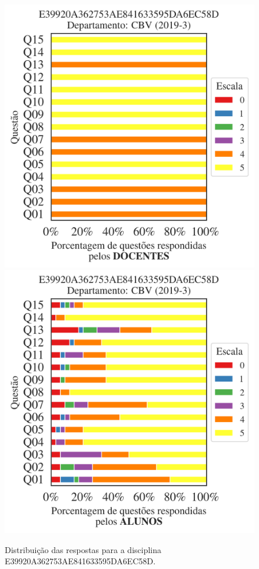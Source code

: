 \documentclass[a4paper,10pt]{article}
\begin{document}
\begin{figure}[h]
\centering
\includegraphics[width=0.485\linewidth]{analise_disciplina_departamento_CBV_E39920A362753AE841633595DA6EC58D_docentes.png}
\includegraphics[width=0.485\linewidth]{analise_disciplina_departamento_CBV_E39920A362753AE841633595DA6EC58D_alunos.png}
\caption{\label{fig:analise_geral_departamento}                Distribuição das respostas para a disciplina E39920A362753AE841633595DA6EC58D. }
\end{figure}
\end{document}
